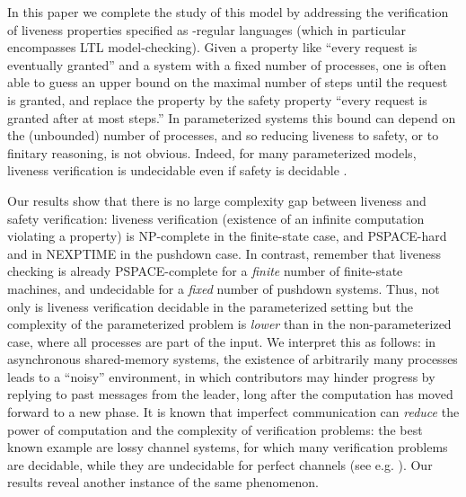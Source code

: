 \documentclass{llncs}
\begin{document}
In this paper we complete the study of this model by addressing the verification of liveness properties 
specified as -regular languages (which in particular encompasses LTL model-checking). 
Given a property like ``every request is eventually granted''
and a system with a fixed number of processes, one is often able to guess an upper bound
on the maximal number of steps until the request is granted, and replace the property
by the safety property ``every request is granted after at most  steps.'' 
In parameterized systems this bound can depend on the (unbounded) number of processes, and so 
reducing liveness to safety, or to finitary reasoning, is not obvious. 
Indeed, for many parameterized models, liveness verification is undecidable even if safety is decidable \cite{EFM99,rmeyer2008}.

Our results show that there is no large complexity gap between liveness and
safety verification: liveness verification (existence of an infinite computation
violating a property) is NP-complete in the finite-state
case, and PSPACE-hard and in NEXPTIME in the pushdown case.  
In contrast, remember that liveness checking is already PSPACE-complete for a {\em finite} number of finite-state
machines, and undecidable for a {\em fixed} number of pushdown systems.
Thus, not only is liveness verification decidable in the parameterized setting but 
the complexity of the parameterized problem is {\em lower} 
than in the non-parameterized case, where all processes are part of the
input. We interpret this as follows: in asynchronous shared-memory systems, the
existence of arbitrarily many processes leads to a ``noisy'' environment, in
which contributors may hinder progress by replying to past messages from the
leader, long after the computation has moved forward to a new phase. It is known
that imperfect communication  can {\em reduce} the power of computation and the complexity of verification
problems: the best known example are lossy channel systems, for which many verification
problems are decidable, while they are undecidable for perfect channels 
(see e.g. \cite{AbJo:lossy:IC,Parosh:etal:attractor:IC}). 
Our results reveal another instance of the same phenomenon.
\end{document}
